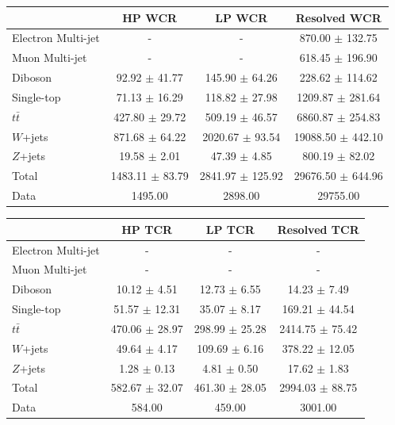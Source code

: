 \begin{table}

\begin{tabular}{|l|c|c|c|}
\hline
	  &	 HP WCR &	 LP WCR &	Resolved WCR \\\hline 
	Electron Multi-jet &	- &	- &	870.00 $\pm$ 132.75 \\\hline 
	Muon Multi-jet &	- &	- &	618.45 $\pm$ 196.90 \\\hline 
	Diboson &	92.92 $\pm$ 41.77 &	145.90 $\pm$ 64.26 &	228.62 $\pm$ 114.62 \\\hline 
	Single-top &	71.13 $\pm$ 16.29 &	118.82 $\pm$ 27.98 &	1209.87 $\pm$ 281.64 \\\hline 
	$t\bar{t}$ &	427.80 $\pm$ 29.72 &	509.19 $\pm$ 46.57 &	6860.87 $\pm$ 254.83 \\\hline 
	$W$+jets &	871.68 $\pm$ 64.22 &	2020.67 $\pm$ 93.54 &	19088.50 $\pm$ 442.10 \\\hline 
	$Z$+jets &	19.58 $\pm$ 2.01 &	47.39 $\pm$ 4.85 &	800.19 $\pm$ 82.02 \\\hline 
	Total &	1483.11 $\pm$ 83.79 &	2841.97 $\pm$ 125.92 &	29676.50 $\pm$ 644.96 \\\hline 
	Data &	1495.00 &	2898.00 &	29755.00 \\\hline 
\end{tabular}

\begin{tabular}{|l|c|c|c|}
\hline
	  &	 HP TCR &	 LP TCR &	Resolved TCR \\\hline 
	Electron Multi-jet &	- &	- &	- \\\hline 
	Muon Multi-jet &	- &	- &	- \\\hline 
	Diboson &	10.12 $\pm$ 4.51 &	12.73 $\pm$ 6.55 &	14.23 $\pm$ 7.49 \\\hline 
	Single-top &	51.57 $\pm$ 12.31 &	35.07 $\pm$ 8.17 &	169.21 $\pm$ 44.54 \\\hline 
	$t\bar{t}$ &	470.06 $\pm$ 28.97 &	298.99 $\pm$ 25.28 &	2414.75 $\pm$ 75.42 \\\hline 
	$W$+jets &	49.64 $\pm$ 4.17 &	109.69 $\pm$ 6.16 &	378.22 $\pm$ 12.05 \\\hline 
	$Z$+jets &	1.28 $\pm$ 0.13 &	4.81 $\pm$ 0.50 &	17.62 $\pm$ 1.83 \\\hline 
	Total &	582.67 $\pm$ 32.07 &	461.30 $\pm$ 28.05 &	2994.03 $\pm$ 88.75 \\\hline 
	Data &	584.00 &	459.00 &	3001.00 \\\hline 
\end{tabular}


\end{table}

